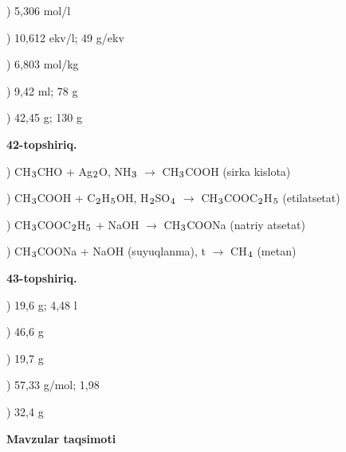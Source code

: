 \documentclass[11pt,a4paper]{article}
\renewcommand{\textsubscript}[1]{\ensuremath{_{\text{\fontsize{8}{8}\selectfont #1}}}}
\begin{document}
) 5,306 mol/l\par
{}) 10,612 ekv/l; 49 g/ekv\par
{}) 6,803 mol/kg\par
{}) 9,42 ml; 78 g\par
{}) 42,45 g; 130 g\par
\noindent\textbf{42-topshiriq.}\par
{}) CH\textsubscript{3}CHO + Ag\textsubscript{2}O, NH\textsubscript{3} $\to$ CH\textsubscript{3}COOH (sirka kislota)\par
{}) CH\textsubscript{3}COOH + C\textsubscript{2}H\textsubscript{5}OH, H\textsubscript{2}SO\textsubscript{4} $\to$ CH\textsubscript{3}COOC\textsubscript{2}H\textsubscript{5} (etilatsetat)\par
{}) CH\textsubscript{3}COOC\textsubscript{2}H\textsubscript{5} + NaOH $\to$ CH\textsubscript{3}COONa (natriy atsetat)\par
{}) CH\textsubscript{3}COONa + NaOH (suyuqlanma), t\textdegree{} $\to$ CH\textsubscript{4} (metan)\par
\noindent\textbf{43-topshiriq.}\par
{}) 19,6 g; 4,48 l\par
{}) 46,6 g\par
{}) 19,7 g\par
{}) 57,33 g/mol; 1,98\par
{}) 32,4 g\par
\par\bigskip\noindent\textbf{Mavzular taqsimoti}\par\smallskip
\end{document}
